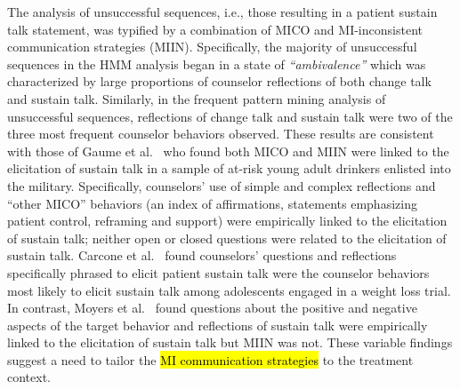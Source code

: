 The analysis of unsuccessful sequences, i.e., those resulting in a patient sustain talk statement, was typified by a combination of MICO and MI-inconsistent communication strategies (MIIN). Specifically, the majority of unsuccessful sequences in the HMM analysis began in a state of \textit{``ambivalence''} which was characterized by large proportions of counselor reflections of both change talk and sustain talk. Similarly, in the frequent pattern mining analysis of unsuccessful sequences, reflections of change talk and sustain talk were two of the three most frequent counselor behaviors observed. These results are consistent with those of Gaume et al.~\cite{gaume2010counselor} who found both MICO and MIIN were linked to the elicitation of sustain talk in a sample of at-risk young adult drinkers enlisted into the military. Specifically, counselors' use of simple and complex reflections and ``other MICO'' behaviors (an index of affirmations, statements emphasizing patient control, reframing and support) were empirically linked to the elicitation of sustain talk; neither open or closed questions were related to the elicitation of sustain talk. Carcone et al.~\cite{carcone2013provider} found counselors' questions and reflections specifically phrased to elicit patient sustain talk were the counselor behaviors most likely to elicit sustain talk among adolescents engaged in a weight loss trial. In contrast, Moyers et al.~\cite{moyers2009session} found questions about the positive and negative aspects of the target behavior and reflections of sustain talk were empirically linked to the elicitation of sustain talk but MIIN was not. These variable findings suggest a need to tailor the \hl{MI communication strategies} to the treatment context. 

